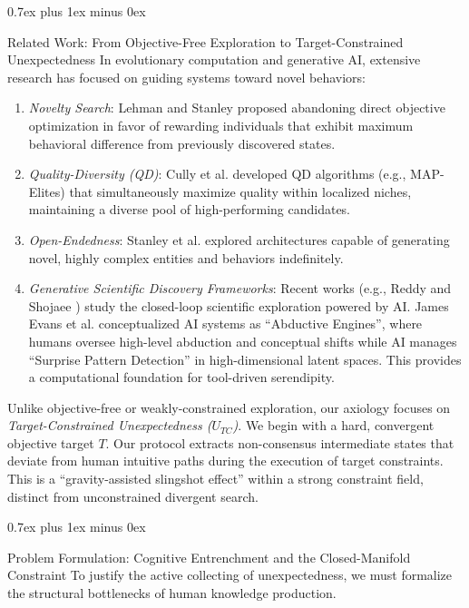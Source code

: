 \documentclass[10pt,journal,compsoc]{IEEEtran}
\makeatletter
\renewcommand{\section}{\@startsection{section}{1}{\z@}{-3.5ex plus -2ex minus -1.5ex}%
{0.7ex plus 1ex minus 0ex}{\normalfont\sublargesize\sffamily\bfseries\scshape\raggedright}}
\makeatother
\begin{document}
\section{Related Work: From Objective-Free Exploration to Target-Constrained Unexpectedness}
In evolutionary computation and generative AI, extensive research has focused on guiding systems toward novel behaviors:
\begin{enumerate}
\item \textit{Novelty Search}: Lehman and Stanley \cite{lehman} proposed abandoning direct objective optimization in favor of rewarding individuals that exhibit maximum behavioral difference from previously discovered states.
\item \textit{Quality-Diversity (QD)}: Cully et al. \cite{cully} developed QD algorithms (e.g., MAP-Elites) that simultaneously maximize quality within localized niches, maintaining a diverse pool of high-performing candidates.
\item \textit{Open-Endedness}: Stanley et al. \cite{stanley19} explored architectures capable of generating novel, highly complex entities and behaviors indefinitely.
\item \textit{Generative Scientific Discovery Frameworks}: Recent works (e.g., Reddy and Shojaee \cite{reddy}) study the closed-loop scientific exploration powered by AI. James Evans et al. conceptualized AI systems as ``Abductive Engines'', where humans oversee high-level abduction and conceptual shifts while AI manages ``Surprise Pattern Detection'' in high-dimensional latent spaces. This provides a computational foundation for tool-driven serendipity.
\end{enumerate}

Unlike objective-free or weakly-constrained exploration, our axiology focuses on \textit{Target-Constrained Unexpectedness ($U_{TC}$)}. We begin with a hard, convergent objective target $T$. Our protocol extracts non-consensus intermediate states that deviate from human intuitive paths during the execution of target constraints. This is a ``gravity-assisted slingshot effect'' within a strong constraint field, distinct from unconstrained divergent search.

\section{Problem Formulation: Cognitive Entrenchment and the Closed-Manifold Constraint}
To justify the active collecting of unexpectedness, we must formalize the structural bottlenecks of human knowledge production.
\end{document}
